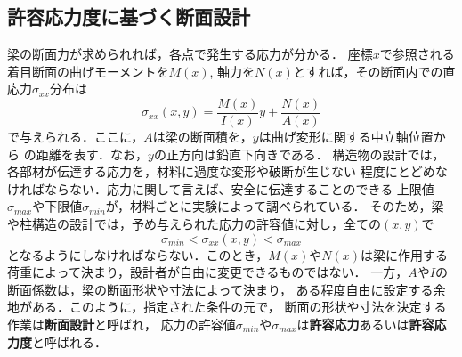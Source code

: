 \documentclass[10pt,a4j]{jbook}
\begin{document}
\subsection{許容応力度に基づく断面設計}
梁の断面力が求められれば，各点で発生する応力が分かる．
座標$x$で参照される着目断面の曲げモーメントを$M(x)$, 
軸力を$N(x)$とすれば，その断面内での直応力$\sigma_{xx}$分布は
\begin{equation}
	\sigma_{xx}(x,y)=\frac{M(x)}{I(x)}y+\frac{N(x)}{A(x)}
\end{equation}
で与えられる．ここに，$A$は梁の断面積を，$y$は曲げ変形に関する中立軸位置から
の距離を表す．なお，$y$の正方向は鉛直下向きである．
構造物の設計では，各部材が伝達する応力を，材料に過度な変形や破断が生じない
程度にとどめなければならない．応力に関して言えば、安全に伝達することのできる
上限値$\sigma_{max}$や下限値$\sigma_{min}$が，材料ごとに実験によって調べられている．
そのため，梁や柱構造の設計では，予め与えられた応力の許容値に対し，全ての$(x,y)$で
\begin{equation}
	\sigma_{min}< \sigma_{xx}(x,y) < \sigma_{max}
	\label{eqn:sxx_siga}
\end{equation}
となるようにしなければならない．このとき，$M(x)$や$N(x)$は梁に作用する
荷重によって決まり，設計者が自由に変更できるものではない．
一方，$A$や$I$の断面係数は，梁の断面形状や寸法によって決まり，
ある程度自由に設定する余地がある．このように，指定された条件の元で，
断面の形状や寸法を決定する作業は{\bf 断面設計}と呼ばれ，
応力の許容値$\sigma_{min}$や$\sigma_{max}$は{\bf 許容応力}あるいは{\bf 許容応力度}と呼ばれる．
\end{document}
